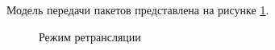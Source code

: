 Модель передачи пакетов представлена на рисунке \ref{img:2}.

\begin{figure}[h]
\caption{Режим ретрансляции}
\label{img:2}
\end{figure}


